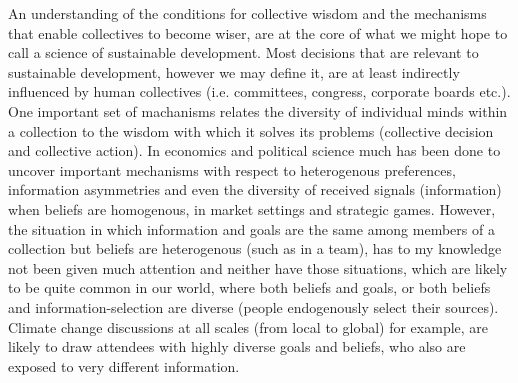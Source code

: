 \documentclass[12pt]{article}
\begin{document}
An understanding of the conditions for collective wisdom and the mechanisms that enable collectives to become wiser, are at the core of what we might hope to call a science of sustainable development. Most decisions that are relevant to sustainable development, however we may define it, are at least indirectly influenced by human collectives (i.e. committees, congress, corporate boards etc.). One important set of machanisms relates the diversity of individual minds within a collection to the wisdom with which it solves its problems (collective decision and collective action). In economics and political science much has been done to uncover important mechanisms with respect to heterogenous preferences, information asymmetries and even the diversity of received signals (information) when beliefs are homogenous, in market settings and strategic games. However, the situation in which information and goals are the same among members of a collection but beliefs are heterogenous (such as in a team), has to my knowledge not been given much attention and neither have those situations, which are likely to be quite common in our world, where both beliefs and goals, or both beliefs and information-selection are diverse (people endogenously select their sources). Climate change discussions at all scales (from local to global) for example, are likely to draw attendees with highly diverse goals and beliefs, who also are exposed to very different information.\\
\end{document}
